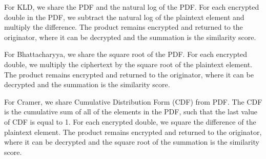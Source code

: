 For KLD, we share the PDF and the natural log of the PDF. For each encrypted double in the PDF, we subtract the natural log of the plaintext element and multiply the difference. The product remains encrypted and returned to the originator, where it can be decrypted and the summation is the similarity score.

For Bhattacharyya, we share the square root of the PDF. For each encrypted double, we multiply the ciphertext by the square root of the plaintext element. The product remains encrypted and returned to the originator, where it can be decrypted and the summation is the similarity score.

For Cramer, we share Cumulative Distribution Form (CDF) from PDF. The CDF is the cumulative sum of all of the elements in the PDF, such that the last value of CDF is equal to 1. For each encrypted double, we square the difference of the plaintext element. The product remains encrypted and returned to the originator, where it can be decrypted and the square root of the summation is the similarity score.
